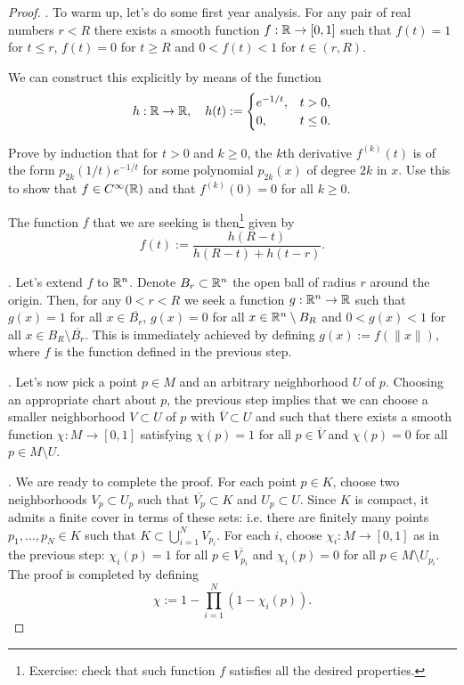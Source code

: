 \begin{proof}
  .
  To warm up, let's do some first year analysis.
  For any pair of real numbers $r < R$ there exists a smooth function $f: \mathbb{R} \to [0,1]$ such that $f(t) = 1$ for $t \leq r$, $f(t) = 0$ for $t \geq R$ and $0<f(t)<1$ for $t\in(r,R)$.
  
  We can construct this explicitly by means of the function
  \begin{equation}
    h:\mathbb{R}\to\mathbb{R}, \quad h(t):= \begin{cases}
      e^{-1/t}, & t>0,\\
      0, & t \leq 0.
    \end{cases}
  \end{equation}

  \begin{exercise}
    Prove by induction that for $t>0$ and $k\geq 0$, the $k$th derivative $f^{(k)}(t)$ is of the form $p_{2k}(1/t)e^{-1/t}$ for some polynomial $p_{2k}(x)$ of degree $2k$ in $x$.
    Use this to show that $f\in C^\infty(\mathbb{R})$ and that $f^{(k)}(0) = 0$ for all $k\geq 0$.
  \end{exercise}

  The function $f$ that we are seeking is then\footnote{Exercise: check that such function $f$ satisfies all the desired properties.} given by
  \begin{equation}
    f(t) := \frac{h(R-t)}{h(R-t) + h(t-r)}.
  \end{equation}

  .
  Let's extend $f$ to $\mathbb{R}^n$.
  Denote $B_r \subset \mathbb{R}^n$ the open ball of radius $r$ around the origin.
  Then, for any $0 < r < R$ we seek a function $g:\mathbb{R}^n\to\mathbb{R}$ such that $g(x) = 1$ for all $x\in \overline{B_r}$, $g(x) = 0$ for all $x\in \mathbb{R}^n\setminus B_R$ and $0< g(x)< 1$ for all $x\in B_R\setminus\overline{B_r}$.
  This is immediately achieved by defining $g(x) := f(\|x\|)$, where $f$ is the function defined in the previous step.

  .
  Let's now pick a point $p\in M$ and an arbitrary neighborhood $U$ of $p$. Choosing an appropriate chart about $p$, the previous step implies that we can choose a smaller neighborhood $V\subset U$ of $p$ with $\overline V\subset U$ and such that there exists a smooth function $\chi: M \to [0,1]$ satisfying $\chi(p) = 1$ for all $p\in\overline{V}$ and $\chi(p) = 0$ for all $p\in M\setminus U$.
  
  .
  We are ready to complete the proof.
  For each point $p\in K$, choose two neighborhoods $V_p \subset U_p$ such that $\overline{V_p}\subset K$ and $U_p \subset U$.
  Since $K$ is compact, it admits a finite cover in terms of these sets: i.e. there are finitely many points $p_1, \ldots, p_N \in K$ such that $K \subset \bigcup_{i=1}^N V_{p_i}$.
  For each $i$, choose $\chi_i: M \to [0,1]$ as in the previous step: $\chi_i(p) = 1$ for all $p\in\overline{V_{p_i}}$ and $\chi_i(p) = 0$ for all $p\in M\setminus U_{p_i}$.
  The proof is completed by defining
  \begin{equation}
    \chi := 1 - \prod_{i=1}^N(1 - \chi_i(p)).
  \end{equation}
\end{proof}

